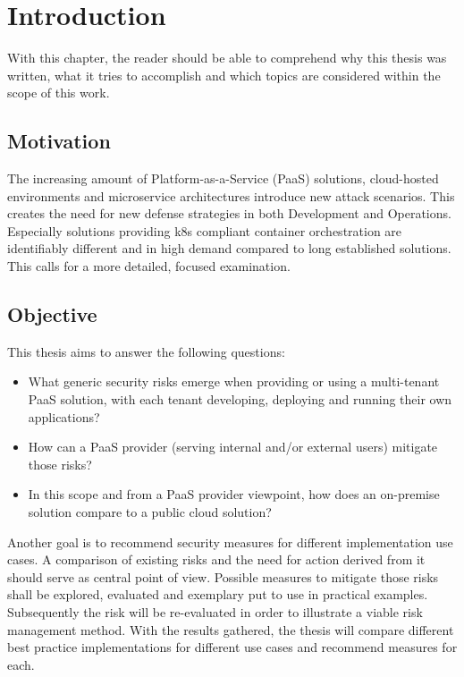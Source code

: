 \chapter{Introduction}
With this chapter, the reader should be able to comprehend why this thesis was written, 
what it tries to accomplish and which topics are considered within the scope of this work.

\section{Motivation}

The increasing amount of Platform-as-a-Service (PaaS) solutions, cloud-hosted environments and microservice architectures introduce new attack scenarios. 
This creates the need for new defense strategies in both Development and Operations. 
Especially solutions providing \gls{k8s} compliant container orchestration are identifiably different and in high demand compared to long established solutions. 
This calls for a more detailed, focused examination. 

\section{Objective} \label{goal}

This thesis aims to answer the following questions:

\begin{itemize}

\item What generic security risks emerge when providing or using a multi-tenant PaaS solution,
with each tenant developing, deploying and running their own applications? 

\item How can a PaaS provider (serving internal and/or external users) mitigate those risks? 

\item  In this scope and from a PaaS provider viewpoint, how does an on-premise solution compare
to a public cloud solution? 

\end{itemize}

Another goal is to recommend security measures for different implementation use cases.
A comparison of existing risks and the need for action derived from it should serve as central point of view. 
Possible measures to mitigate those risks shall be explored, evaluated and exemplary put to use in practical examples.
Subsequently the risk will be re-evaluated in order to illustrate a viable risk management method.
With the results gathered, the thesis will compare different best practice implementations for different use cases and recommend measures for each.

